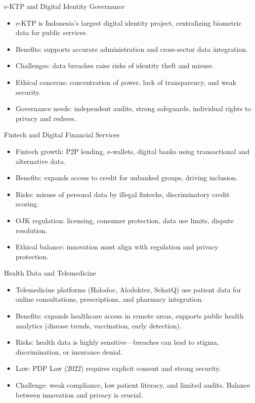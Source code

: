 \documentclass[aspectratio=169, table]{beamer}
\begin{document}
\begin{frame}{e-KTP and Digital Identity Governance}
	\vspace{20pt}
	\begin{itemize}
		\item e-KTP is Indonesia’s largest digital identity project, centralizing biometric data for public services.  
		\item Benefits: supports accurate administration and cross-sector data integration.  
		\item Challenges: data breaches raise risks of identity theft and misuse.  
		\item Ethical concerns: concentration of power, lack of transparency, and weak security.  
		\item Governance needs: independent audits, strong safeguards, individual rights to privacy and redress.  
	\end{itemize}
\end{frame}

\begin{frame}{Fintech and Digital Financial Services}
	\vspace{20pt}
	\begin{itemize}
		\item Fintech growth: P2P lending, e-wallets, digital banks using transactional and alternative data.  
		\item Benefits: expands access to credit for unbanked groups, driving inclusion.  
		\item Risks: misuse of personal data by illegal fintechs, discriminatory credit scoring.  
		\item OJK regulation: licensing, consumer protection, data use limits, dispute resolution.  
		\item Ethical balance: innovation must align with regulation and privacy protection.  
	\end{itemize}
\end{frame}

\begin{frame}{Health Data and Telemedicine}
	\vspace{20pt}
	\begin{itemize}
		\item Telemedicine platforms (Halodoc, Alodokter, SehatQ) use patient data for online consultations, prescriptions, and pharmacy integration.  
		\item Benefits: expands healthcare access in remote areas, supports public health analytics (disease trends, vaccination, early detection).  
		\item Risks: health data is highly sensitive—breaches can lead to stigma, discrimination, or insurance denial.  
		\item Law: PDP Law (2022) requires explicit consent and strong security.  
		\item Challenge: weak compliance, low patient literacy, and limited audits. Balance between innovation and privacy is crucial.  
	\end{itemize}
\end{frame}
\end{document}
